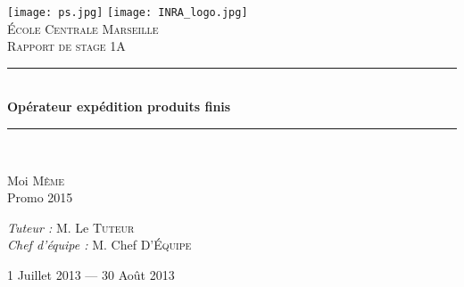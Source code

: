 \documentclass[12pt, openany]{report}
\newcommand{\HRule}{\rule{\linewidth}{0.5mm}}
\begin{document}
\begin{titlepage}
  \begin{sffamily}
  \begin{center}

    \texttt{[image: ps.jpg]}
	\texttt{[image: INRA\_logo.jpg]}
	\\
    \textsc{\LARGE École Centrale Marseille}\\[2cm]

    \textsc{\Large Rapport de stage 1A}\\[1.5cm]
	
    \HRule \\[0.4cm]
    { \huge \bfseries Opérateur expédition produits finis\\[0.4cm] }

    \HRule \\[2cm]
    
   

    \begin{minipage}{0.4\textwidth}
      \begin{flushleft} \large
        Moi \textsc{Même}\\
        Promo 2015\\
      \end{flushleft}
    \end{minipage}
    \begin{minipage}{0.4\textwidth}
      \begin{flushright} \large
        \emph{Tuteur :} M. Le \textsc{Tuteur}\\
        \emph{Chef d'équipe : } M. Chef \textsc{D’Équipe}
      \end{flushright}
    \end{minipage}

    \vfill

    {\large 1\ier{} Juillet 2013 — 30 Août 2013}

  \end{center}
  \end{sffamily}
\end{titlepage}
\end{document}
